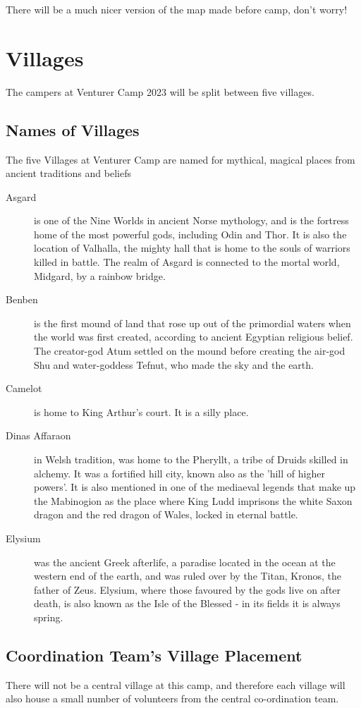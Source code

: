 \documentclass[a4paper, 11pt]{report}
\newcommand{\nl}{\newline}
\begin{document}
There will be a much nicer version of the map made before camp, don't worry!

\chapter{Villages}
The campers at Venturer Camp 2023 will be split between five villages.
\section{Names of Villages}
The five Villages at Venturer Camp are named for mythical, magical places from ancient traditions and beliefs
\begin{description}
    \item[Asgard] is one of the Nine Worlds in ancient Norse mythology, and is the fortress home of the most powerful gods, including Odin and Thor. It is also the location of Valhalla, the mighty hall that is home to the souls of warriors killed in battle. The realm of Asgard is connected to the mortal world, Midgard, by a rainbow bridge.
    \item[Benben] is the first mound of land that rose up out of the primordial waters when the world was first created, according to ancient Egyptian religious belief. The creator-god Atum settled on the mound before creating the air-god Shu and water-goddess Tefnut, who made the sky and the earth.
    \item[Camelot] is home to King Arthur's court. It is a silly place.
    \item[Dinas Affaraon] in Welsh tradition, was home to the Pheryllt, a tribe of Druids skilled in alchemy. It was a fortified hill city, known also as the 'hill of higher powers'. It is also mentioned in one of the mediaeval legends that make up the Mabinogion as the place where King Ludd imprisons the white Saxon dragon and the red dragon of Wales, locked in eternal battle.
    \item[Elysium] was the ancient Greek afterlife, a paradise located in the ocean at the western end of the earth, and was ruled over by the Titan, Kronos, the father of Zeus. Elysium, where those favoured by the gods live on after death, is also known as the Isle of the Blessed - in its fields it is always spring.
\end{description}

\section{Coordination Team's Village Placement}
There will not be a central village at this camp, and therefore each village will also house a small number of volunteers from the central co-ordination team. \nl
\end{document}
